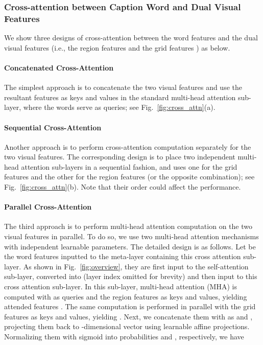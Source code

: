 \documentclass[runningheads]{llncs}
\begin{document}
\subsubsection{Cross-attention between Caption Word and Dual Visual Features}

We show three designs of cross-attention between the word features and the dual visual features (i.e., the region features  and the grid features ) as below. 

\paragraph{Concatenated Cross-Attention}
The simplest approach is to concatenate the two visual features and use the resultant features as keys and values in the standard multi-head attention sub-layer, where the words serve as queries; see Fig.~\ref{fig:cross_attn}(a).

\paragraph{Sequential Cross-Attention}

Another approach is to perform cross-attention computation separately for the two visual features. The corresponding design is to place two independent multi-head attention sub-layers in a sequential fashion, and uses one for the grid features and the other for the region features (or the opposite combination); see Fig.~\ref{fig:cross_attn}(b). Note that their order could affect the performance. 

\paragraph{Parallel Cross-Attention}
The third approach is to perform multi-head attention computation on the two visual features in parallel. To do so, we use two multi-head attention mechanisms with independent learnable parameters. The detailed design is as follows. Let  be the word features inputted to the meta-layer  containing this cross attention sub-layer. As shown in Fig.~\ref{fig:overview}, they are first input to the self-attention sub-layer, converted into  (layer index  omitted for brevity) and then input to this cross attention sub-layer. In this sub-layer, multi-head attention (MHA) is computed with  as queries and the region features  as keys and values, yielding attended features . The same computation is performed in parallel with the grid features  as keys and values, yielding . Next, we concatenate them with  as  and , projecting them back to -dimensional vector using learnable affine projections. Normalizing them with sigmoid into probabilities  and , respectively, we have 
\end{document}
